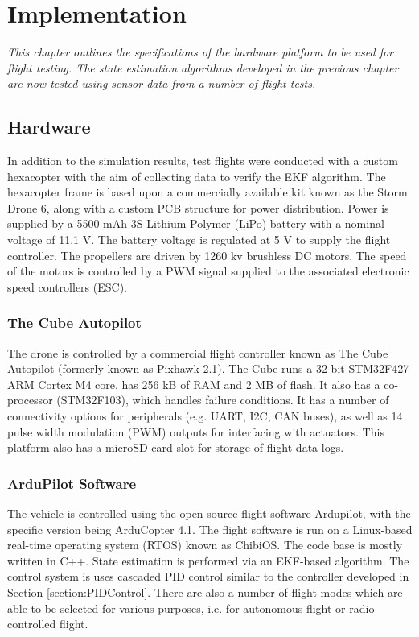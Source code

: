 
\chapter{Implementation}
\textit{This chapter outlines the specifications of the hardware platform to be used for flight testing. The state estimation algorithms developed in the previous chapter are now tested using sensor data from a number of flight tests. }


\section{Hardware}\label{section:Hardware}

In addition to the simulation results, test flights were conducted with a custom hexacopter with the aim of collecting data to verify the EKF algorithm. The hexacopter frame is based upon a commercially available kit known as the Storm Drone 6, along with a custom PCB structure for power distribution. Power is supplied by a 5500 mAh 3S Lithium Polymer (LiPo) battery with a nominal voltage of 11.1 V. The battery voltage is regulated at 5 V to supply the flight controller. The propellers are driven by 1260 kv brushless DC motors. The speed of the motors is controlled by a PWM signal supplied to the associated electronic speed controllers (ESC).

\subsection{The Cube Autopilot}
The drone is controlled by a commercial flight controller known as The Cube Autopilot (formerly known as Pixhawk 2.1). The Cube runs a 32-bit STM32F427 ARM Cortex M4 core, has 256 kB of RAM and 2 MB of flash. It also has a co-processor (STM32F103), which handles failure conditions. It has a number of connectivity options for peripherals (e.g. UART, I2C, CAN buses), as well as 14 pulse width modulation (PWM) outputs for interfacing with actuators. This platform also has a microSD card slot for storage of flight data logs.
\subsection{ArduPilot Software}
The vehicle is controlled using the open source flight software Ardupilot, with the specific version being ArduCopter 4.1. The flight software is run on a Linux-based real-time operating system (RTOS) known as ChibiOS. The code base is mostly written in C++. State estimation is performed via an EKF-based algorithm. The control system is uses cascaded PID control similar to the controller developed in Section \ref{section:PIDControl}. There are also a number of flight modes which are able to be selected for various purposes, i.e. for autonomous flight or radio-controlled flight.


